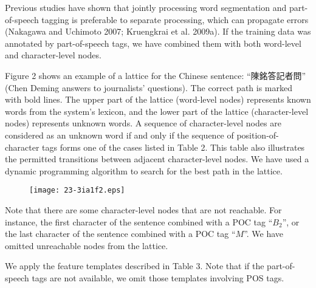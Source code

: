 \documentclass[english]{jnlp_1.4}
\begin{document}
Previous studies have shown that jointly processing word segmentation and part-of-speech tagging is preferable to separate processing, which can propagate errors (Nakagawa and Uchimoto 2007; Kruengkrai et al. 2009a). If the training data was annotated by part-of-speech tags, we have combined them with both word-level and character-level nodes.

Figure 2 shows an example of a lattice for the Chinese sentence: ``陳銘答記者問'' (Chen Deming answers to journalists' questions). The correct path is marked with bold lines. The upper part of the lattice (word-level nodes) represents known words from the system's lexicon, and the lower part of the lattice (character-level nodes) represents unknown words. A sequence of character-level nodes are considered as an unknown word if and only if the sequence of position-of-character tags forms one of the cases listed in Table 2. This table also illustrates the permitted transitions between adjacent character-level nodes. We have used a dynamic programming algorithm to search for the best path in the lattice.

\begin{figure}[t]
\begin{center}
\texttt{[image: 23-3ia1f2.eps]}
\end{center}
\end{figure}

Note that there are some character-level nodes that are not reachable. For instance, the first character of the sentence combined with a POC tag ``$B_2$'', or the last character of the sentence combined with a POC tag ``$M$''. We have omitted unreachable nodes from the lattice.

We apply the feature templates described in Table 3. Note that if the part-of-speech tags are not available, we omit those templates involving POS tags.

\begin{table}[t]

\end{table}
\end{document}
